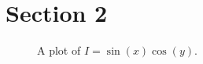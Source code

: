 \documentclass[example-with-subfiles.tex]{subfiles}
\begin{document}
    \section{Section 2}
    \begin{figure}[h]
        \caption{A plot of $I = \sin(x)\cos(y)$.}
        \label{fig:cubic}
    \end{figure}
\end{document}
